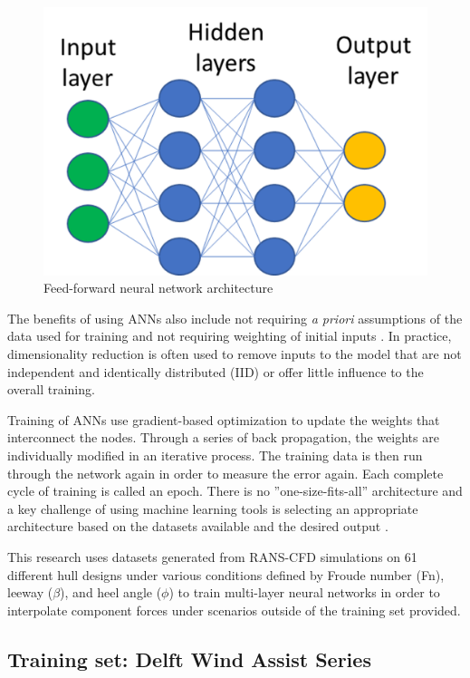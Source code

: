 \documentclass[twoside,twocolumn]{article}
\begin{document}
\begin{figure}[!ht]
\centering
\includegraphics[width=.7\columnwidth]{images/ffnn.png}  %
\caption{Feed-forward neural network architecture}
\label{fig:ffnn}
\end{figure}
%

The benefits of using ANNs also include not requiring \textit{a priori} assumptions of the data used for training and not requiring weighting of initial inputs \citep{Gardner1998}. In practice, dimensionality reduction is often used to remove inputs to the model that are not independent and identically distributed (IID) or offer little influence to the overall training. 

Training of ANNs use gradient-based optimization to update the weights that interconnect the nodes. Through a series of back propagation, the weights are individually modified in an iterative process. The training data is then run through the network again in order to measure the error again. Each complete cycle of training is called an epoch. There is no ''one-size-fits-all'' architecture and a key challenge of using machine learning tools is selecting an appropriate architecture based on the datasets available and the desired output \citep{Wolpert1997}.

This research uses datasets generated from RANS-CFD simulations on 61 different hull designs under various conditions defined by Froude number (Fn), leeway ($\beta$), and heel angle ($\phi$) to train multi-layer neural networks in order to interpolate component forces under scenarios outside of the training set provided. 


\subsection{Training set: Delft Wind Assist Series}
\end{document}
